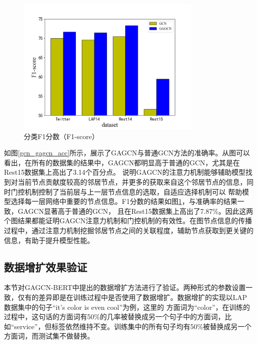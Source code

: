 \begin{figure}[htb]
    \setlength{\belowcaptionskip}{0pt}
    \centering
    \includegraphics[width=0.8\textwidth]{pic/gcn-gagcnF1.png}
    \caption{分类F1分数（F1-score）}
    \label{gcn_gagcn_f1}
\end{figure}

如图\ref{gcn_gagcn_acc}所示，展示了GAGCN与普通GCN方法的准确率。从图可以看出，在所有的数据集的结果中，GAGCN都明显高于普通的GCN，尤其是在Rest15数据集上高出了3.14个百分点。
说明GAGCN的注意力机制能够辅助模型找到对当前节点贡献度较高的邻居节点，并更多的获取来自这个邻居节点的信息，同时门控机制控制了当前层与上一层节点信息的选取，自适应选择机制可以
帮助模型选择每一层网络中重要的节点信息。F1分数的结果如图\ref{gcn_gagcn_f1}，与准确率的结果一致，GAGCN显著高于普通的GCN，
且在Rest15数据集上高出了7.87\%。因此这两个图结果都能证明GAGCN注意力机制和门控机制的有效性。在图节点信息的传播过程中，通过注意力机制挖掘邻居节点之间的关联程度，辅助节点获取到更关键的信息，有助于提升模型性能。

\subsection{数据增扩效果验证}
本节对GAGCN-BERT中提出的数据增扩方法进行了验证。两种形式的参数设置一致，仅有的差异即是在训练过程中是否使用了数据增扩。数据增扩的实现以LAP数据集中的句子“it's color is even cool”为例，这里的
方面词为“color”，在训练的过程中，这句话的方面词有50\%的几率被替换成另一个句子中的方面词，比如“service”，但标签依然维持不变。训练集中的所有句子均有50\%被替换成另一个方面词，而测试集不做替换。

